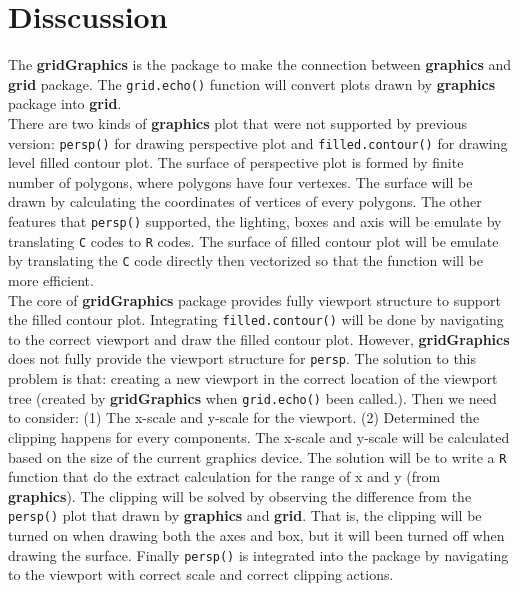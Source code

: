 \documentclass[paper=a4, fontsize=11pt]{report}
\begin{document}
\section{Disscussion}
The \textbf{gridGraphics} is the package to make the connection between \textbf{graphics} and \textbf{grid} package. The \texttt{grid.echo()} function will convert plots drawn by \textbf{graphics} package into \textbf{grid}.\\

There are two kinds of \textbf{graphics} plot that were not supported by previous version: \texttt{persp()} for drawing perspective plot and \texttt{filled.contour()} for drawing level filled contour plot. The surface of perspective plot is formed by finite number of polygons, where polygons have four vertexes. The surface will be drawn by calculating the coordinates of vertices of every polygons. The other features that \texttt{persp()} supported, the lighting, boxes and axis will be emulate by translating \texttt{C} codes to \texttt{R} codes. The surface of filled contour plot will be emulate by translating the \texttt{C} code directly then vectorized so that the function will be more efficient. \\

The core of \textbf{gridGraphics} package provides fully viewport structure to support the filled contour plot. Integrating \texttt{filled.contour()} will be done by navigating to the correct viewport and draw the filled contour plot. However, \textbf{gridGraphics} does not fully provide the viewport structure for \texttt{persp}. The solution to this problem is that: creating a new viewport in the correct location of the viewport tree (created by \textbf{gridGraphics} when \texttt{grid.echo()} been called.). Then we need to consider: (1) The x-scale and y-scale for the viewport. (2) Determined the clipping happens for every components. The x-scale and y-scale will be calculated based on the size of the current graphics device. The solution will be to write a \texttt{R} function that do the extract calculation for the range of x and y (from \textbf{graphics}). The clipping will be solved by observing the difference from the \texttt{persp()} plot that drawn by \textbf{graphics} and \textbf{grid}. That is, the clipping will be turned on when drawing both the axes and box, but it will been turned off when drawing the surface. Finally \texttt{persp()} is integrated into the package by navigating to the viewport with correct scale and correct clipping actions.\\
\end{document}
